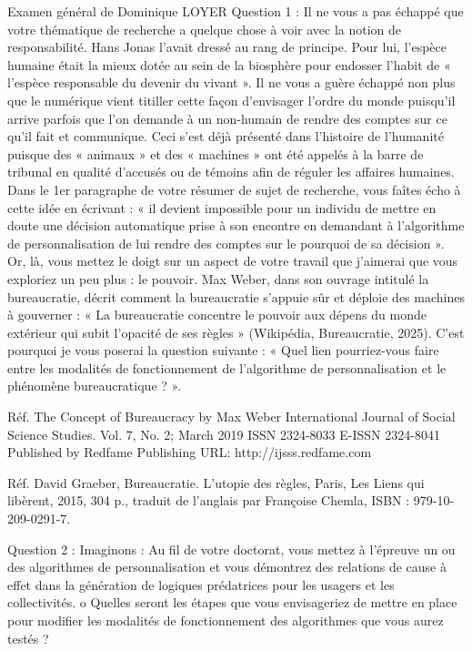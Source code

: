Examen général de Dominique LOYER
Question 1 :
Il ne vous a pas échappé que votre thématique de recherche a quelque chose à voir avec la
notion de responsabilité. Hans Jonas l’avait dressé au rang de principe. Pour lui, l’espèce
humaine était la mieux dotée au sein de la biosphère pour endosser l’habit de « l’espèce
responsable du devenir du vivant ».
Il ne vous a guère échappé non plus que le numérique vient titiller cette façon d’envisager
l’ordre du monde puisqu’il arrive parfois que l’on demande à un non-humain de rendre des
comptes sur ce qu’il fait et communique. Ceci s’est déjà présenté dans l’histoire de
l’humanité puisque des « animaux » et des « machines » ont été appelés à la barre de
tribunal en qualité d’accusés ou de témoins afin de réguler les affaires humaines.
Dans le 1er paragraphe de votre résumer de sujet de recherche, vous faîtes écho à cette idée
en écrivant : « il devient impossible pour un individu de mettre en doute une décision
automatique prise à son encontre en demandant à l’algorithme de personnalisation de lui
rendre des comptes sur le pourquoi de sa décision ».
Or, là, vous mettez le doigt sur un aspect de votre travail que j’aimerai que vous exploriez
un peu plus : le pouvoir. Max Weber, dans son ouvrage intitulé la bureaucratie, décrit
comment la bureaucratie s’appuie sûr et déploie des machines à gouverner : « La
bureaucratie concentre le pouvoir aux dépens du monde extérieur qui subit l’opacité de
ses règles » (Wikipédia, Bureaucratie, 2025). C’est pourquoi je vous poserai la question
suivante : « Quel lien pourriez-vous faire entre les modalités de fonctionnement de
l’algorithme de personnalisation et le phénomène bureaucratique ? ».

Réf. The Concept of Bureaucracy by Max Weber International Journal of Social
Science Studies.
Vol. 7, No. 2; March 2019
ISSN 2324-8033 E-ISSN 2324-8041
Published by Redfame Publishing
URL: http://ijsss.redfame.com

Réf. David Graeber, Bureaucratie. L'utopie des règles, Paris, Les Liens qui libèrent,
2015, 304 p., traduit de l'anglais par Françoise Chemla, ISBN : 979-10-209-0291-7.


Question 2 : Imaginons : Au fil de votre doctorat, vous mettez à l’épreuve un ou des
algorithmes de personnalisation et vous démontrez des relations de cause à effet dans la
génération de logiques prédatrices pour les usagers et les collectivités.
o Quelles seront les étapes que vous envisageriez de mettre en place pour modifier
les modalités de fonctionnement des algorithmes que vous aurez testés ?

